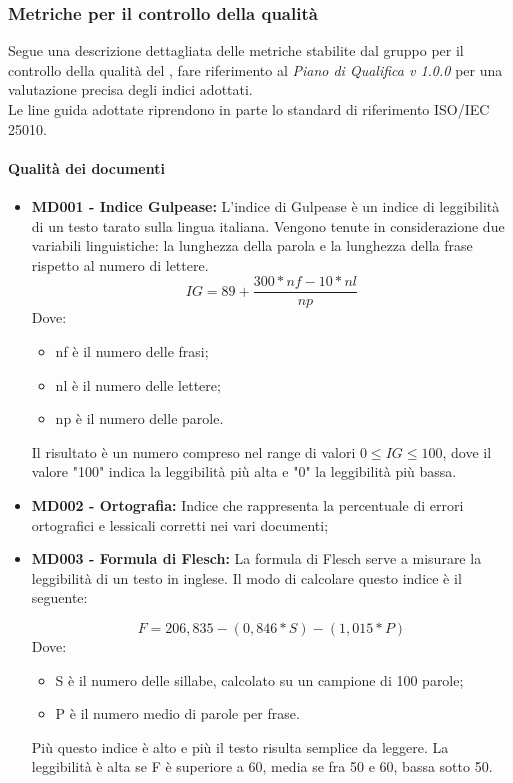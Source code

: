 \subsubsection{Metriche per il controllo della qualità}
Segue una descrizione dettagliata delle metriche stabilite dal gruppo per il controllo della qualità del , fare riferimento al \textit{Piano di Qualifica v 1.0.0} per una valutazione precisa degli indici adottati.\\
Le line guida adottate riprendono in parte lo standard di riferimento ISO/IEC 25010.

\paragraph{Qualità dei documenti}
\begin{itemize}
	\item \textbf{MD001 - Indice Gulpease:} L'indice di Gulpease è un indice di leggibilità di un testo tarato sulla lingua italiana. Vengono tenute in considerazione due variabili linguistiche:  la lunghezza della parola e la lunghezza della frase rispetto al numero di lettere.
	\[ IG = 89+ \frac{300*nf - 10*nl}{np} \]
	Dove:
	\begin{itemize}
		\item nf è il numero delle frasi;
		\item nl è il numero delle lettere;
		\item np è il numero delle parole.
	\end{itemize}
	Il risultato è un numero compreso nel range di valori $0 \le{IG} \le{100}$, dove il valore "100" indica la leggibilità più alta e "0" la leggibilità più bassa.
	
	\item \textbf{MD002 - Ortografia:} Indice che rappresenta la percentuale di errori ortografici e lessicali corretti nei vari documenti;
	
	\item \textbf{MD003 - Formula di Flesch:} La formula di Flesch serve a misurare la leggibilità di un testo in inglese.
	Il modo di calcolare questo indice è il seguente:
	
	\[ F = 206,835 - (0,846*S) - (1,015*P) \]
	Dove:
	\begin{itemize}
		\item S è il numero delle sillabe, calcolato su un campione di 100 parole;
		\item P è il numero medio di parole per frase.
	\end{itemize}
Più questo indice è alto e più il testo risulta semplice da leggere. La leggibilità è alta se F è superiore a 60, media se fra 50 e 60, bassa sotto 50.
\end{itemize}

